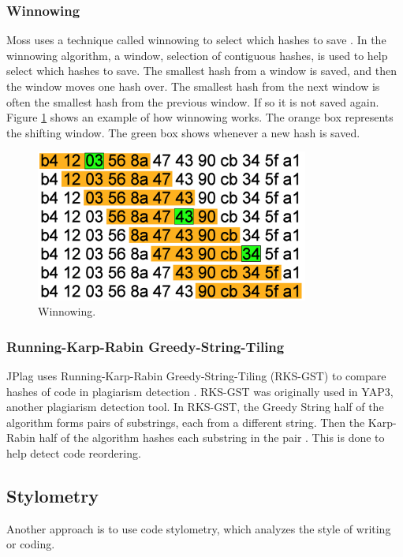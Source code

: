 \documentclass[journal,comsoc]{IEEEtran}
\begin{document}
			\subsubsection{Winnowing}
			Moss uses a technique called winnowing to select which hashes to save \cite{schleimer+wilkerson+aiken}. In the winnowing algorithm, a window, selection of contiguous hashes, is used to help select which hashes to save. The smallest hash from a window is saved, and then the window moves one hash over. The smallest hash from the next window is often the smallest hash from the previous window. If so it is not saved again. Figure \ref{fig:winnowing1} shows an example of how winnowing works. The orange box represents the shifting window. The green box shows whenever a new hash is saved.
		
			\begin{figure}[h!]
				\includegraphics[width=0.8\textwidth]{Winnowing.png}
				\caption{Winnowing.}
				\label{fig:winnowing1}
			\end{figure}
		
			\subsubsection{Running-Karp-Rabin Greedy-String-Tiling}
			JPlag uses Running-Karp-Rabin Greedy-String-Tiling (RKS-GST) to compare hashes of code in plagiarism detection \cite{prechelt+malpohl+philippsen}. RKS-GST was originally used in YAP3, another plagiarism detection tool. In RKS-GST, the Greedy String half of the algorithm forms pairs of substrings, each from a different string. Then the Karp-Rabin half of the algorithm hashes each substring in the pair \cite{wise}. This is done to help detect code reordering.
		
		\subsection{Stylometry}
		Another approach is to use code stylometry, which analyzes the style of writing or coding.
		
\end{document}
